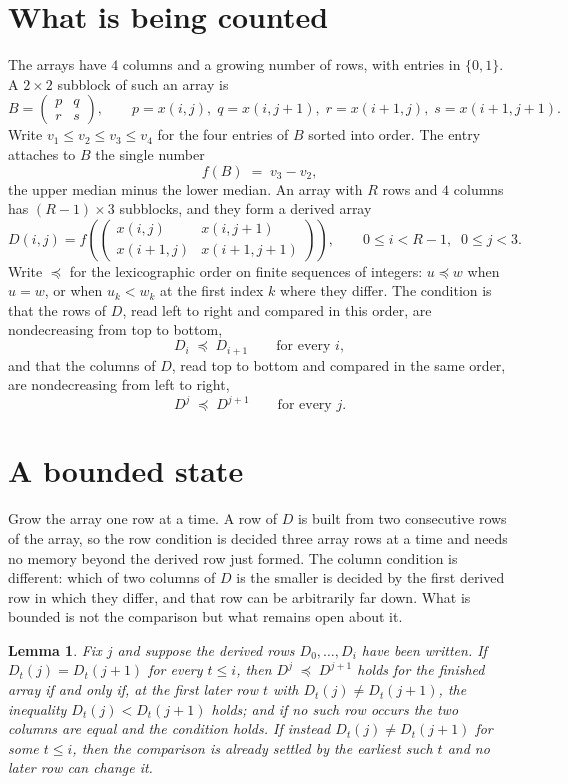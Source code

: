 \documentclass[11pt,a4paper]{article}
\theoremstyle{plain}
\newtheorem{lemma}[theorem]{Lemma}
\theoremstyle{definition}
\begin{document}
\section{What is being counted}

The arrays have $4$ columns and a growing number of rows, with entries in $\{0,1\}$. A
$2\times2$ subblock of such an array is
\[
B=\begin{pmatrix} p & q \\ r & s \end{pmatrix},
\qquad p=x(i,j),\; q=x(i,j+1),\; r=x(i+1,j),\; s=x(i+1,j+1).
\]
Write $v_1\le v_2\le v_3\le v_4$ for the four entries of $B$ sorted into order. The entry attaches to $B$ the single number
\[
f(B)\;=\;v_3-v_2,
\]
the upper median minus the lower median. An array with $R$ rows and $4$ columns has $(R-1)\times3$ subblocks, and they
form a derived array
\[
D(i,j)=f\!\left(\begin{pmatrix} x(i,j) & x(i,j+1) \\ x(i+1,j) & x(i+1,j+1)\end{pmatrix}
\right),\qquad 0\le i<R-1,\;\; 0\le j<3 .
\]
Write $\preceq$ for the lexicographic order on finite sequences of integers: $u\preceq w$ when
$u=w$, or when $u_k<w_k$ at the first index $k$ where they differ. The condition is that the
rows of $D$, read left to right and compared in this order, are nondecreasing from top to bottom,
\[
D_{i}\;\preceq\;D_{i+1}\qquad\text{for every } i,
\]
and that the columns of $D$, read top to bottom and compared in the same order, are nondecreasing
from left to right,
\[
D^{j}\;\preceq\;D^{j+1}\qquad\text{for every } j .
\]

\section{A bounded state}

Grow the array one row at a time. A row of $D$ is built from two consecutive rows of the array,
so the row condition is decided three array rows at a time and needs no memory beyond the
derived row just formed. The column condition is different: which of two columns of $D$ is the
smaller is decided by the first derived row in which they differ, and that row can be
arbitrarily far down. What is bounded is not the comparison but what remains open about it.

\begin{lemma}\label{lem:bits}
Fix $j$ and suppose the derived rows $D_0,\dots,D_i$ have been written. If $D_t(j)=D_t(j+1)$ for
every $t\le i$, then $D^{j}\;\preceq\;D^{j+1}$ holds for the finished array if and only if,
at the first later row $t$ with $D_t(j)\neq D_t(j+1)$, the inequality $D_t(j)<D_t(j+1)$
holds; and if no such row occurs the two columns are equal and the condition holds. If instead
$D_t(j)\neq D_t(j+1)$ for some $t\le i$, then the comparison is already settled by the earliest
such $t$ and no later row can change it.
\end{lemma}
\end{document}
